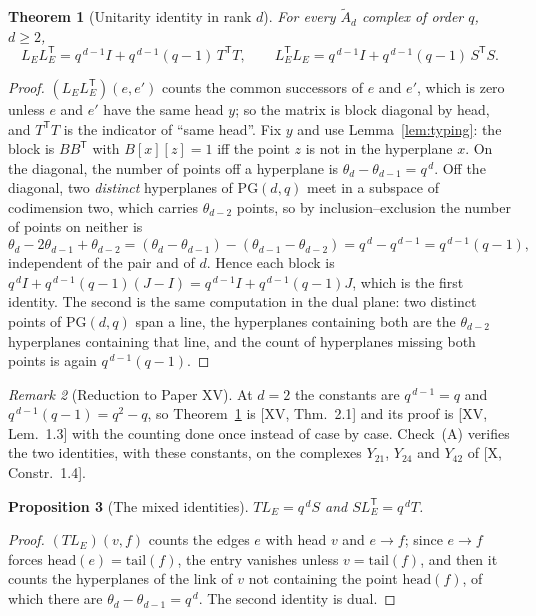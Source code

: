 \documentclass[11pt]{amsart}
\numberwithin{equation}{section}
\newtheorem{theorem}{Theorem}[section]
\newtheorem{proposition}[theorem]{Proposition}
\theoremstyle{definition}
\theoremstyle{remark}
\newtheorem{remark}[theorem]{Remark}
\newcommand{\Atilde}[1]{\widetilde A_{#1}}
\newcommand{\LE}{L_{E}}
\newcommand{\PG}{\mathrm{PG}}
\begin{document}
\begin{theorem}[Unitarity identity in rank $d$]\label{thm:main}
For every $\Atilde d$ complex of order $q$, $d\ge2$,
\[
\LE\LE^{\mathsf T}=q^{\,d-1}I+q^{\,d-1}(q-1)\,T^{\mathsf T}T,
\qquad
\LE^{\mathsf T}\LE=q^{\,d-1}I+q^{\,d-1}(q-1)\,S^{\mathsf T}S .
\]
\end{theorem}

\begin{proof}
$(\LE\LE^{\mathsf T})(e,e')$ counts the common successors of $e$ and $e'$, which is zero
unless $e$ and $e'$ have the same head $y$; so the matrix is block diagonal by head, and
$T^{\mathsf T}T$ is the indicator of ``same head''. Fix $y$ and use
Lemma~\ref{lem:typing}: the block is $BB^{\mathsf T}$ with $B[x][z]=1$ iff the point $z$
is not in the hyperplane $x$. On the diagonal, the number of points off a hyperplane is
$\theta_d-\theta_{d-1}=q^{\,d}$. Off the diagonal, two \emph{distinct} hyperplanes of
$\PG(d,q)$ meet in a subspace of codimension two, which carries $\theta_{d-2}$ points, so
by inclusion--exclusion the number of points on neither is
\[
\theta_d-2\theta_{d-1}+\theta_{d-2}
=(\theta_d-\theta_{d-1})-(\theta_{d-1}-\theta_{d-2})
=q^{\,d}-q^{\,d-1}=q^{\,d-1}(q-1),
\]
independent of the pair and of $d$. Hence each block is
$q^{\,d}I+q^{\,d-1}(q-1)(J-I)=q^{\,d-1}I+q^{\,d-1}(q-1)J$, which is the first identity.
The second is the same computation in the dual plane: two distinct points of $\PG(d,q)$
span a line, the hyperplanes containing both are the $\theta_{d-2}$ hyperplanes containing
that line, and the count of hyperplanes missing both points is again $q^{\,d-1}(q-1)$.
\end{proof}

\begin{remark}[Reduction to Paper XV]\label{rem:d2}
At $d=2$ the constants are $q^{\,d-1}=q$ and $q^{\,d-1}(q-1)=q^2-q$, so
Theorem~\ref{thm:main} is [XV, Thm.~2.1] and its proof is [XV, Lem.~1.3] with the
counting done once instead of case by case. Check~(A) verifies the two identities, with
these constants, on the complexes $Y_{21}$, $Y_{24}$ and $Y_{42}$ of [X, Constr.~1.4].
\end{remark}

\begin{proposition}[The mixed identities]\label{prop:mixed}
$T\LE=q^{\,d}S$ and $S\LE^{\mathsf T}=q^{\,d}T$.
\end{proposition}

\begin{proof}
$(T\LE)(v,f)$ counts the edges $e$ with head $v$ and $e\to f$; since $e\to f$ forces
$\mathrm{head}(e)=\mathrm{tail}(f)$, the entry vanishes unless $v=\mathrm{tail}(f)$, and
then it counts the hyperplanes of the link of $v$ not containing the point
$\mathrm{head}(f)$, of which there are $\theta_d-\theta_{d-1}=q^{\,d}$. The second
identity is dual.
\end{proof}
\end{document}

